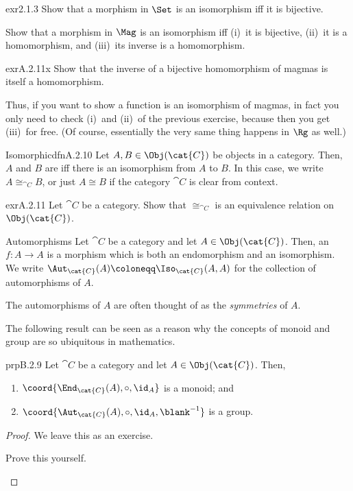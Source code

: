 \begin{exr}{}{exr2.1.3}
Show that a morphism in $\Set$ is an isomorphism iff it is bijective.
\end{exr}
\begin{exr}{}{}
Show that a morphism in $\Mag$ is an isomorphism iff (i)~it is bijective, (ii)~it is a homomorphism, and (iii)~its inverse is a homomorphism.
\end{exr}
\begin{exr}{}{exrA.2.11x}
Show that the inverse of a bijective homomorphism of magmas is itself a homomorphism.
\begin{rmk}
Thus, if you want to show a function is an isomorphism of magmas, in fact you only need to check (i)~and (ii)~of the previous exercise, because then you get (iii)~for free.  (Of course, essentially the very same thing happens in $\Rg$ as well.)
\end{rmk}
\end{exr}
\begin{dfn}{Isomorphic}{dfnA.2.10}
Let $A,B\in \Obj (\cat{C})$ be objects in a category.  Then, $A$ and $B$ are  iff there is an isomorphism from $A$ to $B$.  In this case, we write $A\cong _{\cat{C}}B$, or just $A\cong B$ if the category $\cat{C}$ is clear from context.
\end{dfn}
\begin{exr}{}{exrA.2.11}
Let $\cat{C}$ be a category.  Show that $\cong _{\cat{C}}$ is an equivalence relation on $\Obj (\cat{C})$.
\end{exr}
\begin{dfn}{Automorphisms}{}
Let $\cat{C}$ be a category and let $A\in \Obj (\cat{C})$.  Then, an  $f\colon A\rightarrow A$ is a morphism which is both an endomorphism and an isomorphism.  We write $\Aut _{\cat{C}}(A)\coloneqq \Iso _{\cat{C}}(A,A)$ for the collection of automorphisms of $A$.
\begin{rmk}
The automorphisms of $A$ are often thought of as the \emph{symmetries} of $A$.
\end{rmk}
\end{dfn}
The following result can be seen as a reason why the concepts of monoid and group are so ubiquitous in mathematics.
\begin{prp}{}{prpB.2.9}
Let $\cat{C}$ be a category and let $A\in \Obj (\cat{C})$.  Then,
\begin{enumerate}
\item $\coord{\End _{\cat{C}}(A),\circ ,\id _A}$ is a monoid; and
\item $\coord{\Aut _{\cat{C}}(A),\circ ,\id _A,\blank ^{-1}}$ is a group.
\end{enumerate}
\begin{proof}
We leave this as an exercise.
\begin{exr}{}{}
Prove this yourself.
\end{exr}
\end{proof}
\end{prp}

